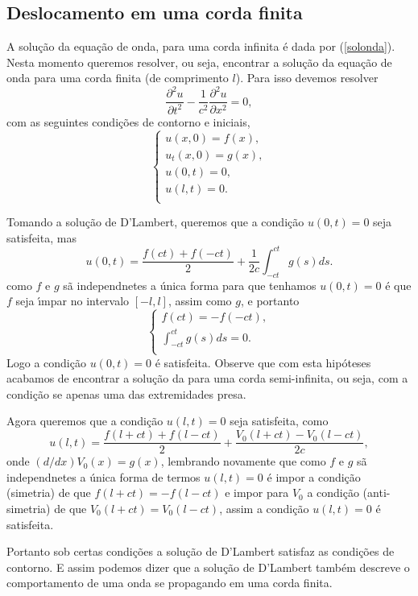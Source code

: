 \subsection{Deslocamento em uma corda finita}

A solu\c{c}\~ao da equa\c{c}\~ao de onda, para uma corda infinita
\'e dada por (\ref{solonda}). Nesta momento queremos resolver, ou
seja, encontrar a solu\c{c}\~ao da equa\c{c}\~ao de onda para uma
corda finita (de comprimento $l$). Para isso devemos resolver
\[\frac{\partial^{2}u}{\partial t^{2}}-\frac{1}{c^{2}} \frac{\partial^{2}u}{\partial x^{2}}=0,\]
com as seguintes condi\c{c}\~oes de contorno e iniciais,
\[\left \{ \begin{array}{l}
               u(x,0)=f(x),\\
               u_{t}(x,0)=g(x),\\
               u(0,t)=0,\\
               u(l,t)=0.\\
 \end{array} \right. \]

Tomando a solu\c{c}\~ao de D'Lambert, queremos que  a
condi\c{c}\~ao $u(0,t)=0$ seja satisfeita, mas
\[u(0,t)=\frac{f(ct)+f(-ct)}{2}+\frac{1}{2c}\int_{-ct}^{ct}g(s)ds.\]
como $f$ e  $g$ s\~a independnetes a \'unica forma para que tenhamos $u(0,t)=0$ \'e que
 $f$ seja \'\i mpar no intervalo $[-l,l]$, assim como $g$, e portanto
\[\left \{ \begin{array}{l}
               f(ct)=-f(-ct),\\
               \int_{-ct}^{ct}g(s)ds=0.\\
 \end{array} \right. \]
Logo a  condi\c{c}\~ao $u(0,t)=0$  \'e satisfeita. Observe
que com esta hip\'oteses acabamos de encontrar a solu\c{c}\~ao
 da para uma corda semi-infinita, ou seja, com a condi\c{c}\~ao se apenas uma das extremidades presa.

Agora queremos que a condi\c{c}\~ao $u(l,t)=0$ seja satisfeita,
como
\[u(l,t)=\frac{f(l+ct)+f(l-ct)}{2}+\frac{V_{0}(l+ct)-V_{0}(l-ct)}{2c},\]
onde $(d/dx)V_{0}(x)=g(x)$, lembrando novamente que como $f$ e  $g$ s\~a independnetes a \'unica forma
de termos $u(l,t)=0$ \'e impor a condi\c{c}\~ao (simetria) de
que $f(l+ct)=-f(l-ct)$ e impor para $V_{0}$ a condi\c{c}\~ao
(anti-simetria) de que $V_{0}(l+ct)=V_{0}(l-ct)$, assim a
condi\c{c}\~ao $u(l,t)=0$ \'e satisfeita.

Portanto sob certas condi\c{c}\~oes  a solu\c{c}\~ao de D'Lambert
satisfaz as condi\c{c}\~oes de contorno. E assim podemos dizer que
a solu\c{c}\~ao de D'Lambert tamb\'em descreve o comportamento  de
uma onda se propagando em uma corda finita.

